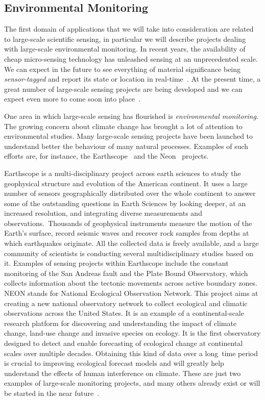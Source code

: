 \subsection*{Environmental Monitoring}
\label{envmon}
The first domain of applications that we will take into consideration are related to large-scale
scientific sensing, in particular we will describe projects dealing with large-scale environmental
monitoring.  In recent years, the availability of cheap micro-sensing technology has unleashed sensing
at an unprecedented scale. We can expect in the future to see everything of material significance being \emph{sensor-tagged} and report its state or location in
real-time~\cite{irisnet,qpsn,stream-processing-challanges}. At the present time, a great number of
large-scale sensing projects are being developed and we can expect even more to come soon into
place~\cite{earthscope,neon,casa-lead,swissexp}.

One area in which large-scale sensing has flourished is \emph{environmental monitoring}. The growing
concern about climate change has brought a lot of attention to environmental studies. Many
large-scale sensing projects have been launched to understand better the behaviour of many natural
processes.
Examples of such efforts are, for instance, the Earthscope~\cite{earthscope} and the Neon~\cite{neon}
projects.

\vspace{-5pt}
Earthscope is a multi-disciplinary project across earth sciences to study the geophysical structure and
evolution of the American continent. It uses a large number of sensors geographically distributed over
the whole continent to answer some of the outstanding questions in Earth Sciences by looking deeper, at
an increased resolution, and integrating diverse measurements and observations.~Thousands of geophysical
instruments measure the motion of the Earth's surface, record seismic waves and recover rock samples from
depths at which earthquakes originate. All the collected data is freely available, and a large community
of scientists is conducting several multidisciplinary studies based on it. Examples of sensing
projects within Earthscope include the constant monitoring of the San Andreas fault and the Plate Bound
Observatory, which collects information about the tectonic movements across active boundary zones.
NEON stands for National Ecological Observation Network. This project aims at creating a new national
observatory network to collect ecological and climatic observations across the United States. It is an
example of a continental-scale research platform for discovering and understanding the impact of climate
change, land-use change and invasive species on ecology. It is the first observatory designed to detect
and enable forecasting of ecological change at continental scales over multiple decades. Obtaining this
kind of data over a \mbox{long time} period is crucial to improving ecological forecast models and will
greatly help understand the effects of human interference on climate. These are just
two examples of large-scale monitoring projects, and many others already exist or will be started in the
near future~\cite{testban,skysurvey,neon,usvo}.

